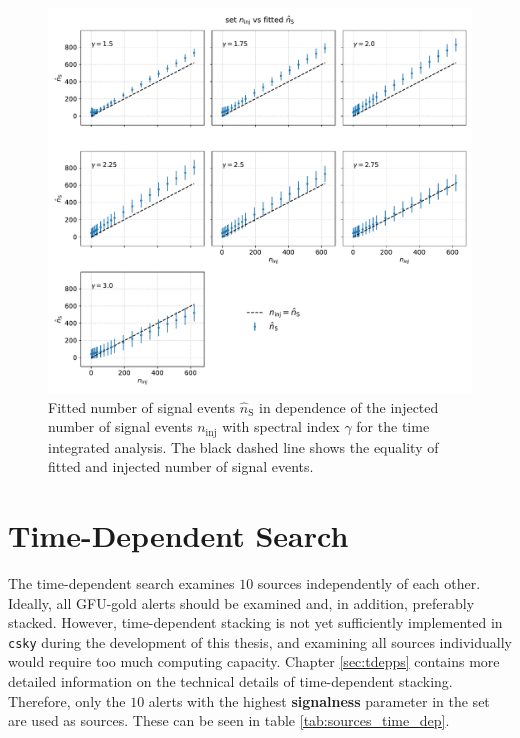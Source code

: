 \begin{figure}
    \centering
    \includegraphics[width=\linewidth]{Plots/05_csky/ns_fit_auto_4.pdf}
    \caption{Fitted number of signal events $\hat{n}_{\text{S}}$ in dependence of the injected number of signal events $n_\text{inj}$ with spectral index $\gamma$ for the time integrated analysis. The black dashed line shows the equality of fitted and injected number of signal events.}
    \label{fig:fit_bias_ns}
\end{figure}

\chapter{Time-Dependent Search} \label{sec:csky_time_dep}

The time-dependent search examines $\num{10}$ sources independently of each other.
Ideally, all GFU-gold alerts should be examined and, in addition, preferably stacked.
However, time-dependent stacking is not yet sufficiently implemented in \texttt{csky} during the development of this thesis, and examining all sources individually would require too much computing capacity.
Chapter \ref{sec:tdepps} contains more detailed information on the technical details of time-dependent stacking.
Therefore, only the $\num{10}$ alerts with the highest \textbf{signalness} parameter in the set are used as sources.
These can be seen in table \ref{tab:sources_time_dep}.

